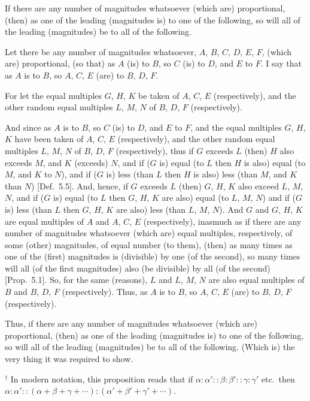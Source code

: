 \begin{Parallel}{}{}
{If there are any number  of magnitudes whatsoever
(which are) proportional, (then) as one of the leading (magnitudes is) to one of the following, so
will 
all of the leading (magnitudes) be to all of the following.

\epsfysize=1.3in
\centerline{}

Let there be any number of magnitudes whatsoever, 
$A$, $B$, $C$, $D$, $E$, $F$, (which are) proportional, (so that) as $A$ (is) to $B$, so $C$ (is) to $D$, and 
$E$ to $F$. I say that as $A$ is to $B$, so  $A$, $C$, $E$ (are) to  $B$, $D$, $F$.

For let the equal multiples $G$, $H$,  $K$ be taken of $A$, $C$, $E$
(respectively), and the other random equal multiples $L$, $M$,  $N$ of
$B$, $D$, $F$ (respectively).

And since as $A$ is to $B$, so $C$ (is) to $D$, and $E$ to $F$, and the equal multiples
$G$, $H$, $K$ have been taken of $A$, $C$,  $E$ (respectively), and the other
random equal multiples $L$, $M$,  $N$ of $B$, $D$,  $F$ (respectively), thus
if $G$ exceeds $L$ (then) $H$ also exceeds $M$, and $K$ (exceeds) $N$, and if ($G$ is)
equal (to $L$ then $H$ is also) equal (to $M$, and $K$  to $N$), and if ($G$ is) less (than $L$ then $H$ is also) less (than $M$, and $K$  than $N$)  [Def.~5.5].  And, hence, if $G$ exceeds $L$ (then)
$G$, $H$, $K$ also exceed $L$, $M$, $N$, and if ($G$ is) equal
(to $L$ then $G$, $H$, $K$ are also) equal (to  $L$, $M$, $N$) and if ($G$ is) less (than $L$ then
$G$, $H$, $K$ are also) less (than $L$, $M$, $N$). And $G$ and $G$, $H$, $K$ are equal multiples
of $A$ and $A$, $C$, $E$ (respectively), inasmuch as if there are any number of magnitudes whatsoever (which are)  equal multiples, respectively, of
some  (other) magnitudes,  of equal  number (to them), (then) as many times as one of the (first) magnitudes is (divisible) by one (of the second), so many times
will all (of the first magnitudes) also (be divisible) by all (of the second)
 [Prop.~5.1]. So, for the same (reasons), $L$
 and $L$, $M$, $N$ are also equal multiples of $B$ and $B$, $D$, $F$ (respectively). Thus,
 as $A$ is to $B$, so $A$, $C$, $E$ (are) to $B$, $D$, $F$ (respectively).
 
Thus, if there are any number  of magnitudes whatsoever
(which are) proportional, (then) as one of the leading (magnitudes is) to one of the following, so
will 
all of the leading (magnitudes) be to all of the following. (Which is) the
very thing it was required to show.}
\end{Parallel}
{\footnotesize \noindent$^\dag$ In modern notation, this proposition
reads that if $\alpha:\alpha'::\beta:\beta'::\gamma:\gamma'$ {\rm etc.}\ then
$\alpha:\alpha'::(\alpha+\beta+\gamma+\cdots):(\alpha'+\beta'+\gamma'+\cdots)$.}

